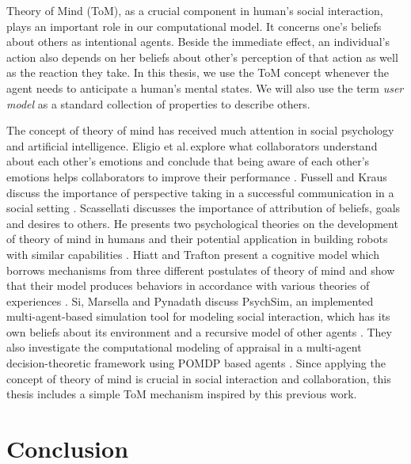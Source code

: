 \documentclass[12pt]{report}
\begin{document}
Theory of Mind (ToM), as a crucial component in human's social interaction,
plays an important role in our computational model. It concerns one's beliefs
about others as intentional agents. Beside the immediate effect, an individual's
action also depends on her beliefs about other's perception of that action as
well as the reaction they take. In this thesis, we use the ToM concept whenever
the agent needs to anticipate a human's mental states. We will also use the
term \textit{user model} as a standard collection of properties to describe
others.

The concept of theory of mind has received much attention in social psychology
and artificial intelligence. Eligio et al.\,explore what collaborators
understand about each other's emotions and conclude that being aware of each
other's emotions helps collaborators to improve their performance
\cite{eligio:emotion-understanding-collaboration}. Fussell and Kraus discuss the
importance of perspective taking in a successful communication in a social
setting \cite{fussell:knowledge-coordination-communication}. Scassellati
discusses the importance of attribution of beliefs, goals and desires to others.
He presents two psychological theories on the development of theory of mind in
humans and their potential application in building robots with similar
capabilities \cite{scassellati:tom-humanoid-robot}. Hiatt and Trafton present a
cognitive model which borrows mechanisms from three different postulates of
theory of mind and show that their model produces behaviors in accordance with
various theories of experiences \cite{hiatt:cognitive-model-tom}. Si, Marsella
and Pynadath discuss PsychSim, an implemented multi-agent-based simulation tool
for modeling social interaction, which has its own beliefs about its environment
and a recursive model of other agents \cite{pynadath:modeling-tom-appraisal}.
They also investigate the computational modeling of appraisal in a multi-agent
decision-theoretic framework using POMDP based agents
\cite{si:modeling-appraisal-tom, si:modeling-appraisal-tom-journal}. Since
applying the concept of theory of mind is crucial in social interaction and
collaboration, this thesis includes a simple ToM mechanism inspired by this
previous work.

\section{Conclusion}
\end{document}
